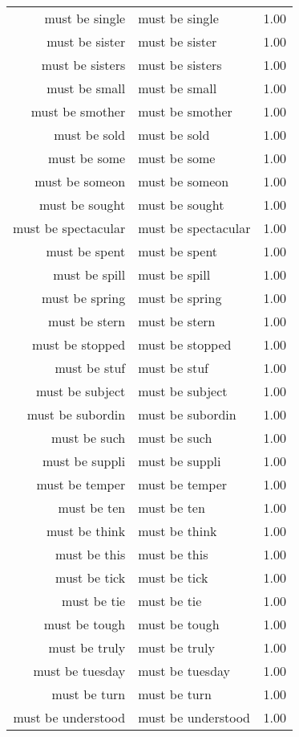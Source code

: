 \begin{table}[ht]
\begin{tabular}{rlr}
  must be single & must be single & 1.00 \\ 
  must be sister & must be sister & 1.00 \\ 
  must be sisters & must be sisters & 1.00 \\ 
  must be small & must be small & 1.00 \\ 
  must be smother & must be smother & 1.00 \\ 
  must be sold & must be sold & 1.00 \\ 
  must be some & must be some & 1.00 \\ 
  must be someon & must be someon & 1.00 \\ 
  must be sought & must be sought & 1.00 \\ 
  must be spectacular & must be spectacular & 1.00 \\ 
  must be spent & must be spent & 1.00 \\ 
  must be spill & must be spill & 1.00 \\ 
  must be spring & must be spring & 1.00 \\ 
  must be stern & must be stern & 1.00 \\ 
  must be stopped & must be stopped & 1.00 \\ 
  must be stuf & must be stuf & 1.00 \\ 
  must be subject & must be subject & 1.00 \\ 
  must be subordin & must be subordin & 1.00 \\ 
  must be such & must be such & 1.00 \\ 
  must be suppli & must be suppli & 1.00 \\ 
  must be temper & must be temper & 1.00 \\ 
  must be ten & must be ten & 1.00 \\ 
  must be think & must be think & 1.00 \\ 
  must be this & must be this & 1.00 \\ 
  must be tick & must be tick & 1.00 \\ 
  must be tie & must be tie & 1.00 \\ 
  must be tough & must be tough & 1.00 \\ 
  must be truly & must be truly & 1.00 \\ 
  must be tuesday & must be tuesday & 1.00 \\ 
  must be turn & must be turn & 1.00 \\ 
  must be understood & must be understood & 1.00 \\ 

\end{tabular}
\end{table}
